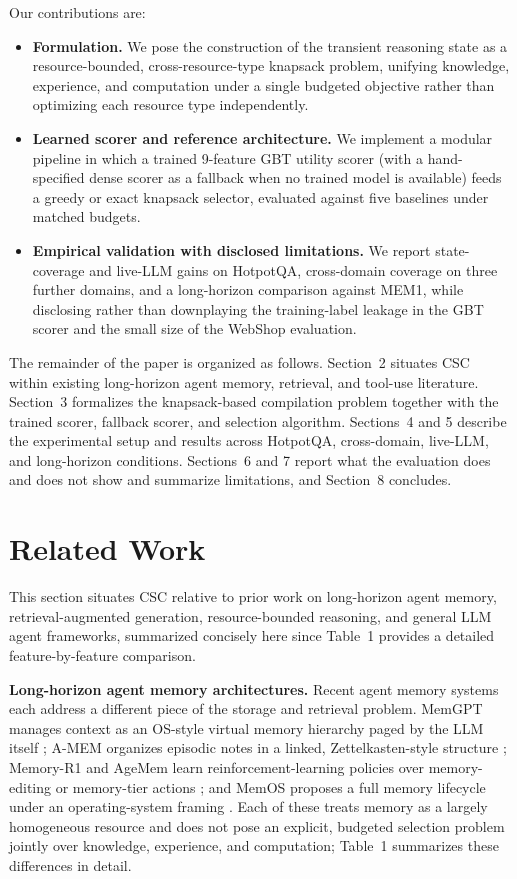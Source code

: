 \documentclass{article}
\begin{document}
Our contributions are:
\begin{itemize}
\item \textbf{Formulation.} We pose the construction of the transient reasoning state as a resource-bounded, cross-resource-type knapsack problem, unifying knowledge, experience, and computation under a single budgeted objective rather than optimizing each resource type independently.
\item \textbf{Learned scorer and reference architecture.} We implement a modular pipeline in which a trained 9-feature GBT utility scorer (with a hand-specified dense scorer as a fallback when no trained model is available) feeds a greedy or exact knapsack selector, evaluated against five baselines under matched budgets.
\item \textbf{Empirical validation with disclosed limitations.} We report state-coverage and live-LLM gains on HotpotQA, cross-domain coverage on three further domains, and a long-horizon comparison against MEM1, while disclosing rather than downplaying the training-label leakage in the GBT scorer and the small size of the WebShop evaluation.
\end{itemize}

The remainder of the paper is organized as follows. Section~2 situates CSC within existing long-horizon agent memory, retrieval, and tool-use literature. Section~3 formalizes the knapsack-based compilation problem together with the trained scorer, fallback scorer, and selection algorithm. Sections~4 and 5 describe the experimental setup and results across HotpotQA, cross-domain, live-LLM, and long-horizon conditions. Sections~6 and 7 report what the evaluation does and does not show and summarize limitations, and Section~8 concludes.

\section{Related Work}

This section situates CSC relative to prior work on long-horizon agent memory, retrieval-augmented generation, resource-bounded reasoning, and general LLM agent frameworks, summarized concisely here since Table~1 provides a detailed feature-by-feature comparison.

\textbf{Long-horizon agent memory architectures.} Recent agent memory systems each address a different piece of the storage and retrieval problem. MemGPT manages context as an OS-style virtual memory hierarchy paged by the LLM itself \citep{packer2023memgpt}; A-MEM organizes episodic notes in a linked, Zettelkasten-style structure \citep{xu2025amem}; Memory-R1 and AgeMem learn reinforcement-learning policies over memory-editing or memory-tier actions \citep{yan2025memoryr1, yu2026agemem}; and MemOS proposes a full memory lifecycle under an operating-system framing \citep{li2025memos}. Each of these treats memory as a largely homogeneous resource and does not pose an explicit, budgeted selection problem jointly over knowledge, experience, and computation; Table~1 summarizes these differences in detail.
\end{document}
